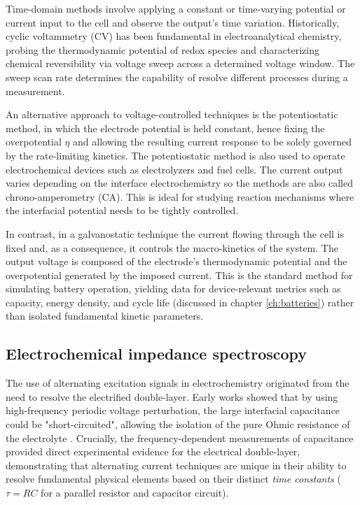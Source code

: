 Time-domain methods involve applying a constant or time-varying potential or current input to the cell and observe the output's time variation.
Historically, cyclic voltammetry (CV) has been fundamental in electroanalytical chemistry, probing the thermodynamic potential of redox species and characterizing chemical reversibility via voltage sweep across a determined voltage window.
The sweep scan rate determines the capability of resolve different processes during a measurement. 

An alternative approach to voltage-controlled techniques is the potentiostatic method, in which the electrode potential is held constant, hence fixing the overpotential $\eta$ and allowing the resulting current response to be solely governed by the rate-limiting kinetics.
The potentiostatic method is also used to operate electrochemical devices such as electrolyzers and fuel cells.
The current output varies depending on the interface electrochemistry so the methods are also called chrono-amperometry (CA). 
This is ideal for studying reaction mechanisms where the interfacial potential needs to be tightly controlled. 

In contrast, in a galvanostatic technique the current flowing through the cell is fixed and, as a consequence, it controls the macro-kinetics of the system. 
The output voltage is composed of the electrode's thermodynamic potential and the overpotential generated by the imposed current.
This is the standard method for simulating battery operation, yielding data for device-relevant metrics such as capacity, energy density, and cycle life (discussed in chapter \ref{ch:batteries}) rather than isolated fundamental kinetic parameters.

\subsection{Electrochemical impedance spectroscopy}
\label{sec:EIS}
The use of alternating excitation signals in electrochemistry originated from the need to resolve the electrified double-layer. 
Early works showed that by using high-frequency periodic voltage perturbation, the large interfacial capacitance could be "short-circuited", allowing the isolation of the pure Ohmic resistance of the electrolyte \cite{randles1947kinetics}. 
Crucially, the frequency-dependent measurements of capacitance provided direct experimental evidence for the electrical double-layer, demonstrating that alternating current techniques are unique in their ability to resolve fundamental physical elements based on their distinct \emph{time constants} ($\tau = RC$ for a parallel resistor and capacitor circuit).

